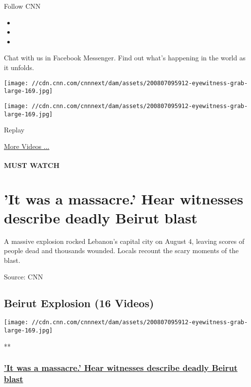 Follow CNN

\begin{itemize}
\item
\item
\item
\end{itemize}

Chat with us in Facebook Messenger. Find out what's happening in the
world as it unfolds.

\texttt{[image: //cdn.cnn.com/cnnnext/dam/assets/200807095912-eyewitness-grab-large-169.jpg]}

\texttt{[image: //cdn.cnn.com/cnnnext/dam/assets/200807095912-eyewitness-grab-large-169.jpg]}\href{javascript:void(0);}{}

Replay

\href{/videos}{More Videos ...}

\hypertarget{must-watch}{%
\paragraph{MUST WATCH}\label{must-watch}}

\hypertarget{it-was-a-massacre-hear-witnesses-describe-deadly-beirut-blast}{%
\section{'It was a massacre.' Hear witnesses describe deadly Beirut
blast}\label{it-was-a-massacre-hear-witnesses-describe-deadly-beirut-blast}}

A massive explosion rocked Lebanon's capital city on August 4, leaving
scores of people dead and thousands wounded. Locals recount the scary
moments of the blast.

Source: CNN

\hypertarget{beirut-explosion-16-videos}{%
\subsection{Beirut Explosion (16
Videos)}\label{beirut-explosion-16-videos}}

\href{/videos/world/2020/08/06/beirut-blast-eyewitness-reaction-lon-orig-na.cnn/video/playlists/beirut-explosion/}{}

\texttt{[image: //cdn.cnn.com/cnnnext/dam/assets/200807095912-eyewitness-grab-large-169.jpg]}

**

\hypertarget{it-was-a-massacre-hear-witnesses-describe-deadly-beirut-blast-1}{%
\subsubsection{\texorpdfstring{\href{/videos/world/2020/08/06/beirut-blast-eyewitness-reaction-lon-orig-na.cnn/video/playlists/beirut-explosion/}{'It
was a massacre.' Hear witnesses describe deadly Beirut
blast}}{'It was a massacre.' Hear witnesses describe deadly Beirut blast}}\label{it-was-a-massacre-hear-witnesses-describe-deadly-beirut-blast-1}}

